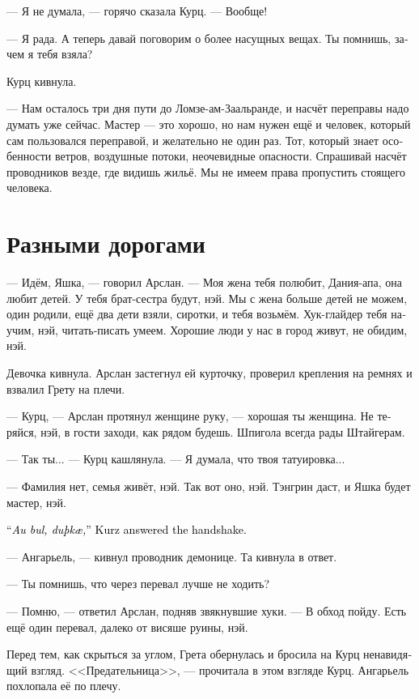 \documentclass[a4paper,12pt,fleqn]{book}\usepackage{cooltooltips}\usepackage{polyglossia}\setdefaultlanguage[babelshorthands=true]{russian}\setotherlanguage{english}\defaultfontfeatures{Ligatures=TeX,Mapping=tex-text} \usepackage{xcolor}\definecolor{lightgray}{HTML}{bbbbbb}\color{lightgray}\newcommand{\ml}[3]{\textenglish{\textcolor{black}{#3}}}
\begin{document}
--- Я не думала, --- горячо сказала Курц.
--- Вообще!

--- Я рада.
А теперь давай поговорим о более насущных вещах.
Ты помнишь, зачем я тебя взяла?

Курц кивнула.

--- Нам осталось три дня пути до Ломзе-ам-Заальранде, и насчёт переправы надо думать уже сейчас.
Мастер --- это хорошо, но нам нужен ещё и человек, который сам пользовался переправой, и желательно не один раз.
Тот, который знает особенности ветров, воздушные потоки, неочевидные опасности.
Спрашивай насчёт проводников везде, где видишь жильё.
Мы не имеем права пропустить стоящего человека.

\section{Разными дорогами}

--- Идём, Яшка, --- говорил Арслан.
--- Моя жена тебя полюбит, Дания-апа, она любит детей.
У тебя брат-сестра будут, нэй.
Мы с жена больше детей не можем, один родили, ещё два дети взяли, сиротки, и тебя возьмём.
Хук-глайдер тебя научим, нэй, читать-писать умеем.
Хорошие люди у нас в город живут, не обидим, нэй.

Девочка кивнула.
Арслан застегнул ей курточку, проверил крепления на ремнях и взвалил Грету на плечи.

--- Курц, --- Арслан протянул женщине руку, --- хорошая ты женщина.
Не теряйся, нэй, в гости заходи, как рядом будешь.
Шпигола всегда рады Штайгерам.

--- Так ты... --- Курц кашлянула.
--- Я думала, что твоя татуировка...

--- Фамилия нет, семья живёт, нэй.
Так вот оно, нэй.
Тэнгрин даст, и Яшка будет мастер, нэй.

\ml{$0$}
{--- Ау бул, дускай, --- Курц ответила на рукопожатие.}
{``\textit{Au bul, duþk\ae{},}'' Kurz answered the handshake.}

--- Ангарьель, --- кивнул проводник демонице.
Та кивнула в ответ.

--- Ты помнишь, что через перевал лучше не ходить?

--- Помню, --- ответил Арслан, подняв звякнувшие хуки.
--- В обход пойду.
Есть ещё один перевал, далеко от висяше руины, нэй.

Перед тем, как скрыться за углом, Грета обернулась и бросила на Курц ненавидящий взгляд.
<<Предательница>>, --- прочитала в этом взгляде Курц.
Ангарьель похлопала её по плечу.
\end{document}

